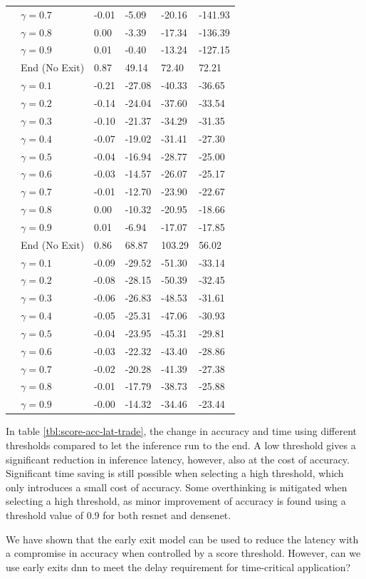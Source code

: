 \begin{scriptsize}
\begin{longtabu}{>{\bfseries}X|X|X[r]|X[r]|X[r]|X[r]}
			&$ \gamma = 0.7 $ 	& -0.01 &  -5.09 & -20.16 & -141.93 \tabularnewline 
			&$ \gamma = 0.8 $ 	&  0.00 &  -3.39 & -17.34 & -136.39 \tabularnewline 
			&$ \gamma = 0.9 $ 	&  0.01 &  -0.40 & -13.24 & -127.15 \tabularnewline 
			\hline
			 & End (No Exit) & 0.87 & 49.14 & 72.40 & 72.21 \tabularnewline {}
			&$ \gamma = 0.1 $ 	& -0.21 & -27.08 & -40.33 & -36.65  \tabularnewline
			&$ \gamma = 0.2 $ 	& -0.14 & -24.04 & -37.60 & -33.54  \tabularnewline 
			&$ \gamma = 0.3 $ 	& -0.10 & -21.37 & -34.29 & -31.35  \tabularnewline
			&$ \gamma = 0.4 $ 	& -0.07 & -19.02 & -31.41 & -27.30  \tabularnewline 
			&$ \gamma = 0.5 $ 	& -0.04 & -16.94 & -28.77 & -25.00  \tabularnewline
			&$ \gamma = 0.6 $ 	& -0.03 & -14.57 & -26.07 & -25.17  \tabularnewline 
			&$ \gamma = 0.7 $ 	& -0.01 & -12.70 & -23.90 & -22.67  \tabularnewline 
			&$ \gamma = 0.8 $ 	&  0.00 & -10.32 & -20.95 & -18.66  \tabularnewline 
			&$ \gamma = 0.9 $ 	&  0.01 &  -6.94 & -17.07 & -17.85  \tabularnewline 
			\hline
			 & End (No Exit) & 0.86 & 68.87 & 103.29 & 56.02 \tabularnewline {}
			&$ \gamma = 0.1 $ 	& -0.09 & -29.52 & -51.30 & -33.14 \tabularnewline
			&$ \gamma = 0.2 $ 	& -0.08 & -28.15 & -50.39 & -32.45 \tabularnewline 
			&$ \gamma = 0.3 $ 	& -0.06 & -26.83 & -48.53 & -31.61 \tabularnewline
			&$ \gamma = 0.4 $ 	& -0.05 & -25.31 & -47.06 & -30.93 \tabularnewline 
			&$ \gamma = 0.5 $ 	& -0.04 & -23.95 & -45.31 & -29.81 \tabularnewline
			&$ \gamma = 0.6 $ 	& -0.03 & -22.32 & -43.40 & -28.86 \tabularnewline 
			&$ \gamma = 0.7 $ 	& -0.02 & -20.28 & -41.39 & -27.38 \tabularnewline 
			&$ \gamma = 0.8 $ 	& -0.01 & -17.79 & -38.73 & -25.88 \tabularnewline 
			&$ \gamma = 0.9 $ 	& -0.00 & -14.32 & -34.46 & -23.44 \tabularnewline 
			\bottomrule
		\end{longtabu}
	\end{scriptsize}

In table \ref{tbl:score-acc-lat-trade}, the change in accuracy and time using different thresholds compared to let the inference run to the end.
A low threshold gives a significant reduction in inference latency, however, also at the cost of accuracy. Significant time saving is still possible when selecting a high threshold, which only introduces a small cost of accuracy. Some overthinking is mitigated when selecting a high threshold, as minor improvement of accuracy is found using a threshold value of 0.9 for both \gls{resnet} and \gls{densenet}.

We have shown that the early exit model can be used to reduce the latency with a compromise in accuracy when controlled by a score threshold. However, can we use early exits \gls{dnn} to meet the delay requirement for time-critical application? 

